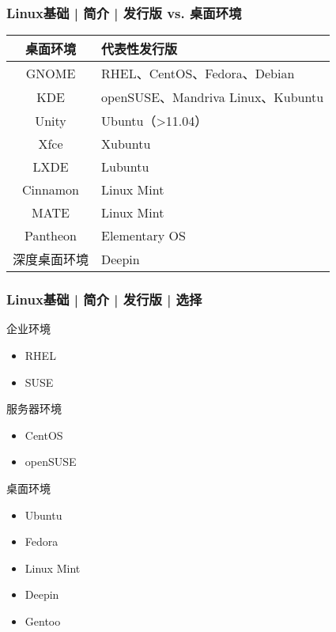 \begin{frame}
  \frametitle{Linux基础 | 简介 | \alert{发行版 vs. 桌面环境}}
  \begin{table}
    \centering
    \begin{tabular}{cl}
      \hline
      \rowcolor{blue!50}桌面环境 & 代表性发行版\\
      \hline
      GNOME & RHEL、CentOS、Fedora、Debian\\
      KDE & openSUSE、Mandriva Linux、Kubuntu\\
      Unity & Ubuntu（>11.04）\\
      Xfce & Xubuntu\\
      LXDE & Lubuntu\\
      Cinnamon & Linux Mint\\
      MATE & Linux Mint\\
      Pantheon & Elementary OS\\
      深度桌面环境 & Deepin\\
      \hline
    \end{tabular}
  \end{table}
\end{frame}

\begin{frame}
  \frametitle{Linux基础 | 简介 | 发行版 | 选择}
  \begin{block}{企业环境}
    \begin{itemize}
      \item RHEL
      \item SUSE
    \end{itemize}
  \end{block}
  \pause
  \begin{block}{服务器环境}
    \begin{itemize}
      \item CentOS
      \item openSUSE
    \end{itemize}
  \end{block}
  \pause
  \begin{block}{桌面环境}
    \begin{itemize}
      \item Ubuntu
      \item Fedora
      \item Linux Mint
      \item Deepin
      \item Gentoo
    \end{itemize}
  \end{block}
\end{frame}

